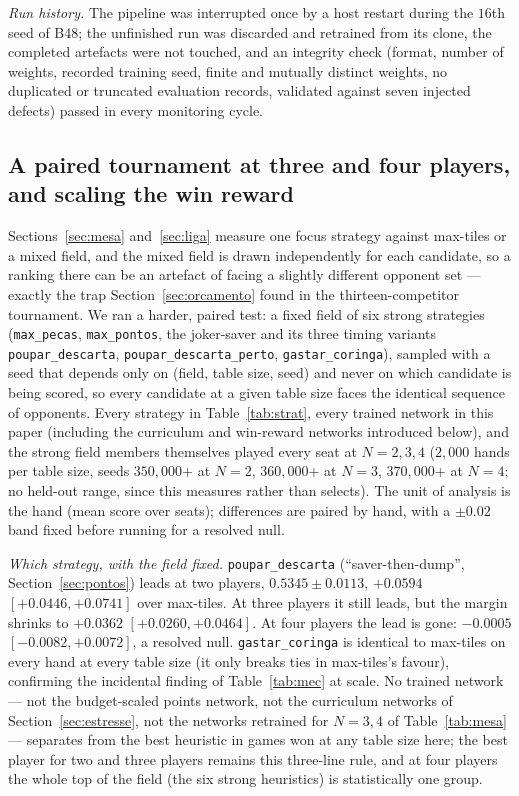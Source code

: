 \documentclass[11pt]{article}
\begin{document}
\emph{Run history.} The pipeline was interrupted once by a host restart during the $16$th seed of B48; the unfinished run was discarded and retrained from its clone, the completed artefacts were not touched, and an integrity check (format, number of weights, recorded training seed, finite and mutually distinct weights, no duplicated or truncated evaluation records, validated against seven injected defects) passed in every monitoring cycle.

\subsection{A paired tournament at three and four players, and scaling the win reward}\label{sec:plano21}
Sections~\ref{sec:mesa} and~\ref{sec:liga} measure one focus strategy against max-tiles or a mixed field, and the mixed field is drawn independently for each candidate, so a ranking there can be an artefact of facing a slightly different opponent set --- exactly the trap Section~\ref{sec:orcamento} found in the thirteen-competitor tournament. We ran a harder, paired test: a fixed field of six strong strategies (\texttt{max\_pecas}, \texttt{max\_pontos}, the joker-saver and its three timing variants \texttt{poupar\_descarta}, \texttt{poupar\_descarta\_perto}, \texttt{gastar\_coringa}), sampled with a seed that depends only on (field, table size, seed) and never on which candidate is being scored, so every candidate at a given table size faces the identical sequence of opponents. Every strategy in Table~\ref{tab:strat}, every trained network in this paper (including the curriculum and win-reward networks introduced below), and the strong field members themselves played every seat at $N=2,3,4$ ($2{,}000$ hands per table size, seeds $350{,}000$+ at $N=2$, $360{,}000$+ at $N=3$, $370{,}000$+ at $N=4$; no held-out range, since this measures rather than selects). The unit of analysis is the hand (mean score over seats); differences are paired by hand, with a $\pm0.02$ band fixed before running for a resolved null.

\emph{Which strategy, with the field fixed.} \texttt{poupar\_descarta} (``saver-then-dump'', Section~\ref{sec:pontos}) leads at two players, $0.5345\pm0.0113$, $+0.0594$ $[+0.0446,+0.0741]$ over max-tiles. At three players it still leads, but the margin shrinks to $+0.0362$ $[+0.0260,+0.0464]$. At four players the lead is gone: $-0.0005$ $[-0.0082,+0.0072]$, a resolved null. \texttt{gastar\_coringa} is identical to max-tiles on every hand at every table size (it only breaks ties in max-tiles's favour), confirming the incidental finding of Table~\ref{tab:mec} at scale. No trained network --- not the budget-scaled points network, not the curriculum networks of Section~\ref{sec:estresse}, not the networks retrained for $N=3,4$ of Table~\ref{tab:mesa} --- separates from the best heuristic in games won at any table size here; the best player for two and three players remains this three-line rule, and at four players the whole top of the field (the six strong heuristics) is statistically one group.
\end{document}
